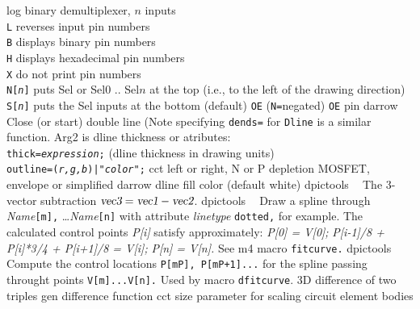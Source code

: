   {log}%
  {binary demultiplexer, $n$ inputs\\
    {\tt L} reverses input pin numbers\\
    {\tt B} displays binary pin numbers\\
    {\tt H} displays hexadecimal pin numbers\\
    {\tt X} do not print pin numbers\\
    {\tt N[{\sl n}]} puts Sel or Sel$0$ .. Sel$n$ at the top
    (i.e., to the left of the drawing direction)\\
    {\tt S[{\sl n}]} puts the Sel inputs at the bottom (default)
    {\tt OE} ({\tt N=}negated) {\tt OE} pin
    }%
%
  {darrow}%
  {Close (or start) double line (Note specifying {\tt dends=} for {\tt Dline}
   is a similar function.  Arg2 is dline thickness or atributes:\\
   {\tt thick={\sl expression};} (dline thickness in drawing units)\\
   {\tt outline=({\sl r,g,b})|"{\sl color}";}}%
%
  {cct}%
  {left or right, N or P depletion MOSFET, envelope or simplified
    }%
%
  {darrow}%
  {dline fill color (default white)}%
%
  {dpictools}%
  {$\;\;$ The 3-vector subtraction
    $\hbox{\sl vec3} = \hbox{\sl vec1} - \hbox{\sl vec2}$.}%
%
  {dpictools}%
  {$\;\;$ Draw a spline through {\sl Name}{\tt [m],} \ldots {\sl Name}{\tt [n]}
   with attribute {\sl linetype} {\tt dotted,} for example.
   The calculated control points {\sl P[i]} satisfy approximately:
   {\sl P[0] = V[0];} {\sl P[i-1]/8 + P[i]*3/4 + P[i+1]/8 = V[i];}
   {\sl P[n] = V[n].}  See m4 macro {\tt fitcurve.}}%
%
  {dpictools}%
  {$\;\;$ Compute the control locations {\tt P[mP], P[mP+1]...} for
  the spline passing throught points {\tt V[m]...V[n].}  Used by
  macro {\tt dfitcurve}.}%
%
  {3D}%
  {difference of two triples}%
%
  {gen}%
  {difference function}%
%
  {cct}%
  {size parameter for scaling circuit element bodies }%
%
